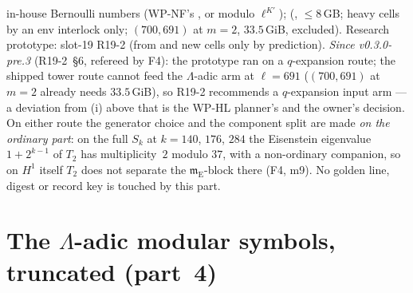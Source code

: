 \documentclass[11pt]{article}
\newcommand{\Iw}{\Lambda}                         %
\newcommand{\Eis}{\mathrm{E}}
\begin{document}
in-house Bernoulli numbers (WP-NF's , or modulo $\ell^{K'}$);  (, $\le8$\,GB; heavy cells by an env
interlock only; $(700,691)$ at $m=2$, $33.5$\,GiB, excluded). Research prototype: slot-19 R19-2 (from  and new cells only by prediction). \emph{Since v0.3.0-pre.3} (R19-2~\S6, refereed by F4):
the prototype ran on a $q$-expansion route; the shipped tower route cannot feed the $\Iw$-adic arm at $\ell=691$ ($(700,691)$ at $m=2$ already needs $33.5$\,GiB), so
R19-2 recommends a $q$-expansion input arm --- a deviation from (i) above that is the WP-HL planner's and the owner's decision. On either route the generator choice
and the component split are made \emph{on the ordinary part}: on the full $S_k$ at $k=140$, $176$, $284$ the Eisenstein eigenvalue $1+2^{k-1}$ of $T_2$ has
multiplicity~$2$ modulo $37$, with a non-ordinary companion, so on $H^{1}$ itself $T_2$ does not separate the $\mathfrak m_\Eis$-block there (F4, m9).
No golden line, digest or record key is touched by this part.

\section{The \texorpdfstring{$\Iw$}{Lambda}-adic modular symbols, truncated (part~4)}\label{sec:u-msym}
\end{document}
